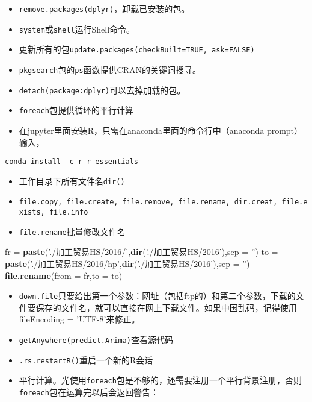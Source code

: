 \documentclass[
]{book}
\newenvironment{Shaded}{\begin{snugshade}}{\end{snugshade}}
\newcommand{\DataTypeTok}[1]{\textcolor[rgb]{0.13,0.29,0.53}{#1}}
\newcommand{\KeywordTok}[1]{\textcolor[rgb]{0.13,0.29,0.53}{\textbf{#1}}}
\newcommand{\NormalTok}[1]{#1}
\newcommand{\StringTok}[1]{\textcolor[rgb]{0.31,0.60,0.02}{#1}}
\providecommand{\tightlist}{%
  \setlength{\itemsep}{0pt}\setlength{\parskip}{0pt}}
\begin{document}
\begin{itemize}
\tightlist
\item
  \texttt{remove.packages(\textquotesingle{}dplyr\textquotesingle{})}，卸载已安装的包。
\item
  \texttt{system}或\texttt{shell}运行Shell命令。
\item
  更新所有的包\texttt{update.packages(checkBuilt=TRUE,\ ask=FALSE)}
\item
  \texttt{pkgsearch}包的\texttt{ps}函数提供CRAN的关键词搜寻。
\item
  \texttt{detach(package:dplyr)}可以去掉加载的包。
\item
  \texttt{foreach}包提供循环的平行计算
\item
  在jupyter里面安装R，只需在anaconda里面的命令行中（anaconda prompt）输入，
\end{itemize}

\begin{verbatim}
conda install -c r r-essentials
\end{verbatim}

\begin{itemize}
\tightlist
\item
  工作目录下所有文件名\texttt{dir()}
\item
  \texttt{file.copy,\ file.create,\ file.remove,\ file.rename,\ dir.creat,\ file.exists,\ file.info}
\item
  \texttt{file.rename}批量修改文件名
\end{itemize}

\begin{Shaded}
\begin{Highlighting}[]
\NormalTok{fr =}\StringTok{ }\KeywordTok{paste}\NormalTok{(}\StringTok{'./加工贸易HS/2016/'}\NormalTok{,}\KeywordTok{dir}\NormalTok{(}\StringTok{'./加工贸易HS/2016'}\NormalTok{),}\DataTypeTok{sep =} \StringTok{''}\NormalTok{)}
\NormalTok{to =}\StringTok{ }\KeywordTok{paste}\NormalTok{(}\StringTok{'./加工贸易HS/2016/hp'}\NormalTok{,}\KeywordTok{dir}\NormalTok{(}\StringTok{'./加工贸易HS/2016'}\NormalTok{),}\DataTypeTok{sep =} \StringTok{''}\NormalTok{)}
\KeywordTok{file.rename}\NormalTok{(}\DataTypeTok{from =}\NormalTok{ fr,}\DataTypeTok{to =}\NormalTok{ to)}
\end{Highlighting}
\end{Shaded}

\begin{itemize}
\tightlist
\item
  \texttt{down.file}只要给出第一个参数：网址（包括ftp的）和第二个参数，下载的文件要保存的文件名，就可以直接在网上下载文件。如果中国乱码，记得使用fileEncoding = 'UTF-8'来修正。
\item
  \texttt{getAnywhere(predict.Arima)}查看源代码
\item
  \texttt{.rs.restartR()}重启一个新的R会话
\item
  平行计算。光使用\texttt{foreach}包是不够的，还需要注册一个平行背景注册，否则\texttt{foreach}包在运算完以后会返回警告：
\end{itemize}
\end{document}
